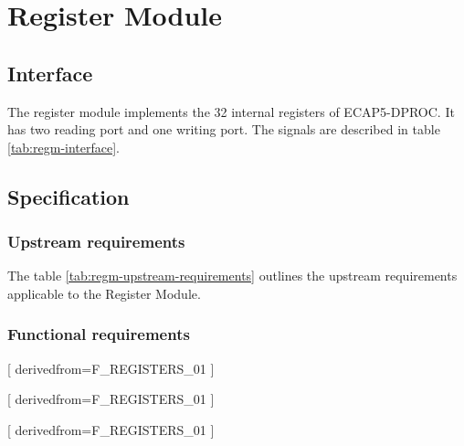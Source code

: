\section{Register Module}

  \subsection{Interface}

    \begin{content}
        The register module implements the 32 internal registers of ECAP5-DPROC. It has two reading port and one writing port. The signals are described in table \ref{tab:regm-interface}. 
      \end{content}

    

  \subsection{Specification}

    \subsubsection{Upstream requirements}

      The table \ref{tab:regm-upstream-requirements} outlines the upstream requirements applicable to the Register Module.

      

    \subsubsection{Functional requirements}

      [
          derivedfrom=F\_REGISTERS\_01
        ]

      [
          derivedfrom=F\_REGISTERS\_01
        ]

      [
          derivedfrom=F\_REGISTERS\_01
        ]

